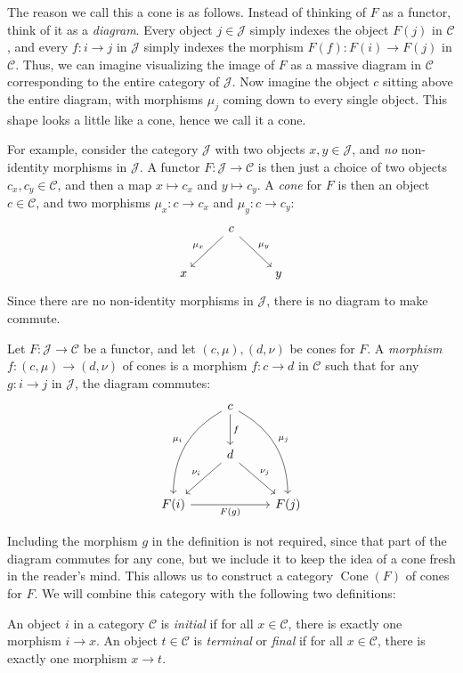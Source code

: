 \documentclass[11pt, A4]{article}
\begin{document}
The reason we call this a cone is as follows. Instead of thinking of $F$ as a functor, think of it as a \emph{diagram}. Every object $j\in \mathcal{J} $ simply indexes the object $F(j)$ in $\mathcal{C} $, and every $f : i \to j$ in $\mathcal{J} $ simply indexes the morphism $F(f): F(i) \to F(j)$ in $\mathcal{C} $. Thus, we can imagine visualizing the image of $F$ as a massive diagram in $\mathcal{C} $ corresponding to the entire category of $\mathcal{J} $. Now imagine the object $c$ sitting above the entire diagram, with morphisms $\mu _j$ coming down to every single object. This shape looks a little like a cone, hence we call it a cone.

For example, consider the category $\mathcal{J} $ with two objects $x,y\in \mathcal{J} $, and \emph{no} non-identity morphisms in $\mathcal{J} $. A functor $F : \mathcal{J}  \to \mathcal{C} $ is then just a choice of two objects $c_x,c_y\in \mathcal{C} $, and then a map $x\mapsto c_x$ and $y\mapsto c_y$. A \emph{cone} for $F$ is then an object $c\in \mathcal{C} $, and two morphisms $\mu_x : c \to c_x$ and $\mu_y : c \to c_y$:
\[\begin{tikzcd}[row sep = 2.5em, column sep = 2.5em]
 & c \ar[" \mu _y ", dr] \ar[" \mu_x "', dl]  &  \\
x &  & y
\end{tikzcd}\]
Since there are no non-identity morphisms in $\mathcal{J} $, there is no diagram to make commute.

\begin{definition}\label{4.3}
	Let $F : \mathcal{J}  \to \mathcal{C} $ be a functor, and let $(c,\mu ),(d,\nu )$ be cones for $F$. A \emph{morphism} $f : (c,\mu ) \to (d,\nu )$ of cones is a morphism $f : c \to d$ in $\mathcal{C} $ such that for any $g : i \to j$ in $\mathcal{J} $, the diagram commutes:
	\[\begin{tikzcd}[row sep = 2.5em, column sep = 2.5em]
	 & c \ar[" f ", d] \ar[" \mu_j ", bend left, ddr] \ar[" \mu _i "', bend right, ddl]  &  \\
	 & d \ar[" \nu _j ", dr] \ar[" \nu _i "', dl]  &  \\
	F(i)\ar[" F(g) "', rr]  &  & F(j)
	\end{tikzcd}\]
\end{definition}

Including the morphism $g$ in the definition is not required, since that part of the diagram commutes for any cone, but we include it to keep the idea of a cone fresh in the reader's mind. This allows us to construct a category $\operatorname{Cone} (F)$ of cones for $F$. We will combine this category with the following two definitions:
\begin{definition}\label{4.4}
	An object $i$ in a category $\mathcal{C} $ is \emph{initial} if for all $x\in \mathcal{C} $, there is exactly one morphism $i\to x$. An object $t\in \mathcal{C} $ is \emph{terminal} or \emph{final} if for all $x\in \mathcal{C} $, there is exactly one morphism $x\to t$.
\end{definition}
\end{document}
